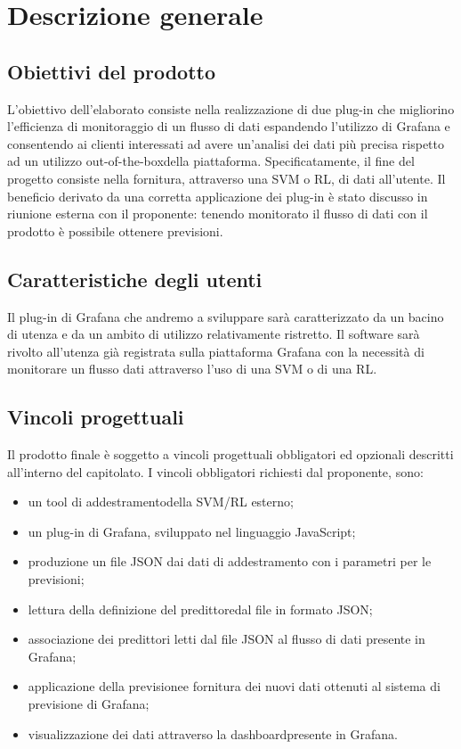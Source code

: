 \section{Descrizione generale}
   
	\subsection{Obiettivi del prodotto}
	L’obiettivo dell’elaborato consiste nella realizzazione di due plug-in che migliorino l’efficienza di monitoraggio di un flusso di dati espandendo l’utilizzo di Grafana e consentendo ai clienti interessati ad avere un’analisi dei dati più precisa rispetto ad un utilizzo out-of-the-box\glo della piattaforma. Specificatamente, il fine del progetto consiste nella fornitura, attraverso una SVM o RL, di dati all’utente. Il beneficio derivato da una corretta applicazione dei plug-in è stato discusso in riunione esterna con il proponente: tenendo monitorato il flusso di dati con il prodotto è possibile ottenere previsioni. 
	\subsection{Caratteristiche degli utenti}
	Il plug-in di Grafana che andremo a sviluppare sarà caratterizzato da un bacino di utenza e da un ambito di utilizzo relativamente ristretto.
Il software sarà rivolto all’utenza già registrata sulla piattaforma Grafana con la necessità di monitorare un flusso dati attraverso l’uso di una SVM o di una RL.

	 \subsection{Vincoli progettuali}
	 Il prodotto finale è soggetto a vincoli progettuali obbligatori ed opzionali descritti all’interno del capitolato. I vincoli obbligatori richiesti dal proponente, sono:

	 	\begin{itemize}
			\item un tool di addestramento\glo della SVM/RL esterno;
	 		\item un plug-in di Grafana, sviluppato nel linguaggio JavaScript;
	 		\item produzione un file JSON dai dati di addestramento con i parametri per le previsioni;
			\item lettura della definizione del predittore\glo dal file in formato JSON;
			\item associazione dei predittori letti dal file JSON al flusso di dati presente in Grafana; 
			\item applicazione della previsione\glo e fornitura dei nuovi dati ottenuti al sistema di previsione di Grafana;
			\item visualizzazione dei dati attraverso la dashboard\glo presente in Grafana.
	 	\end{itemize}

